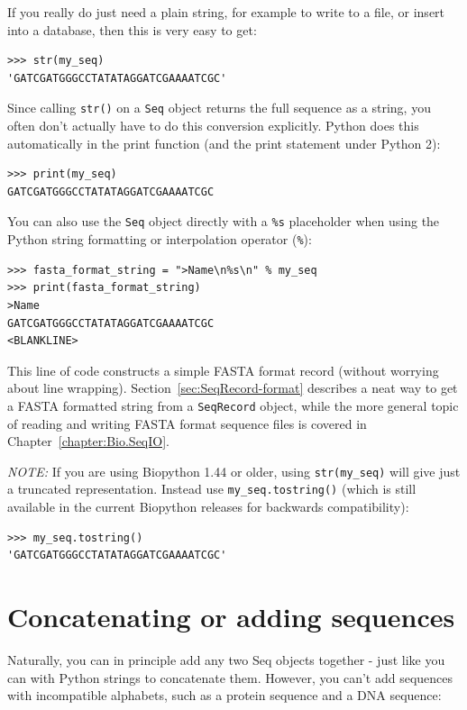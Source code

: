 \documentclass{report}
\begin{document}
If you really do just need a plain string, for example to write to a file, or insert into a database, then this is very easy to get:
\begin{verbatim}
>>> str(my_seq)
'GATCGATGGGCCTATATAGGATCGAAAATCGC'
\end{verbatim}

Since calling \verb|str()| on a \verb|Seq| object returns the full sequence as a string,
you often don't actually have to do this conversion explicitly.
Python does this automatically in the print function
(and the print statement under Python 2):
\begin{verbatim}
>>> print(my_seq)
GATCGATGGGCCTATATAGGATCGAAAATCGC
\end{verbatim}

You can also use the \verb|Seq| object directly with a \verb|%s| placeholder when using the Python string formatting or interpolation operator (\verb|%|):
\begin{verbatim}
>>> fasta_format_string = ">Name\n%s\n" % my_seq
>>> print(fasta_format_string)
>Name
GATCGATGGGCCTATATAGGATCGAAAATCGC
<BLANKLINE>
\end{verbatim}

\noindent This line of code constructs a simple FASTA format record (without worrying about line wrapping).
Section~\ref{sec:SeqRecord-format} describes a neat way to get a FASTA formatted
string from a \verb|SeqRecord| object, while the more general topic of reading and
writing FASTA format sequence files is covered in Chapter~\ref{chapter:Bio.SeqIO}.

\emph{NOTE:} If you are using Biopython 1.44 or older, using \verb|str(my_seq)|
will give just a truncated representation.  Instead use \verb|my_seq.tostring()|
(which is still available in the current Biopython releases for backwards compatibility):

\begin{verbatim}
>>> my_seq.tostring()
'GATCGATGGGCCTATATAGGATCGAAAATCGC'
\end{verbatim}

\section{Concatenating or adding sequences}

Naturally, you can in principle add any two Seq objects together - just like you can with Python strings to concatenate them.  However, you can't add sequences with incompatible alphabets, such as a protein sequence and a DNA sequence:
\end{document}
